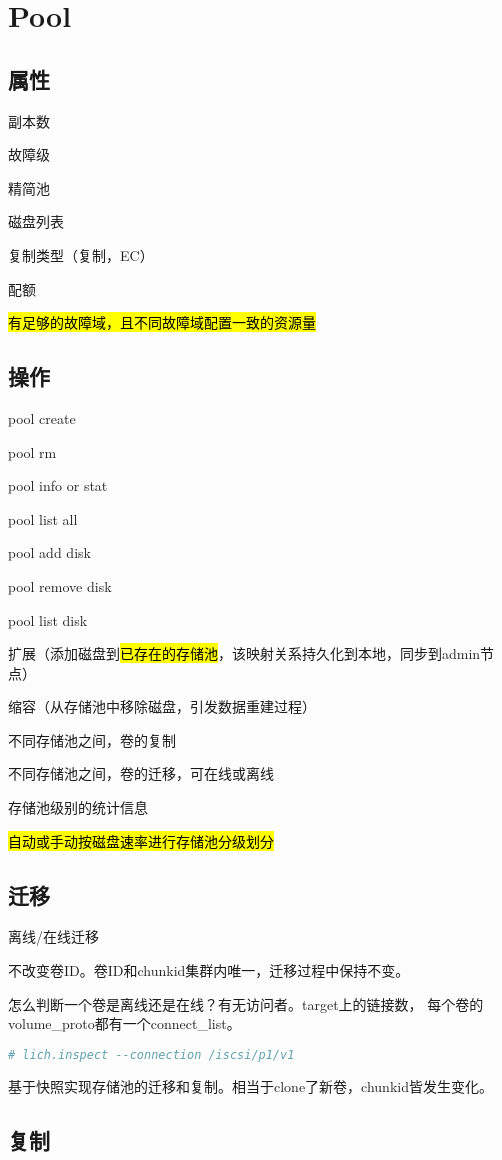 \chapter{Pool}

\section{属性}

\begin{enumbox}
\item 副本数
\item 故障级
\item 精简池
\item 磁盘列表
\item 复制类型（复制，EC）
\item 配额
\item \hl{有足够的故障域，且不同故障域配置一致的资源量}
\end{enumbox}

\section{操作}

\begin{enumbox}
\item pool create
\item pool rm
\item pool info or stat
\item pool list all
\item pool add disk
\item pool remove disk
\item pool list disk
\item 扩展（添加磁盘到\hl{已存在的存储池}，该映射关系持久化到本地，同步到admin节点）
\item 缩容（从存储池中移除磁盘，引发数据重建过程）
\item 不同存储池之间，卷的复制
\item 不同存储池之间，卷的迁移，可在线或离线
\item 存储池级别的统计信息
\item \hl{自动或手动按磁盘速率进行存储池分级划分}
\end{enumbox}

\section{迁移}

离线/在线迁移

不改变卷ID。卷ID和chunkid集群内唯一，迁移过程中保持不变。

怎么判断一个卷是离线还是在线？有无访问者。target上的链接数，
每个卷的volume\_proto都有一个connect\_list。

\begin{lstlisting}[language=bash,frame=single]
# lich.inspect --connection /iscsi/p1/v1
\end{lstlisting}

基于快照实现存储池的迁移和复制。相当于clone了新卷，chunkid皆发生变化。


\section{复制}
